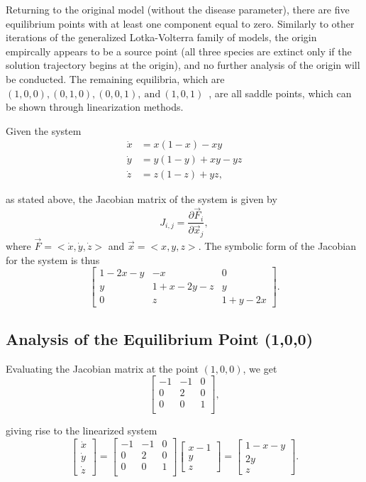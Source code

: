 \documentclass[10pt]{article}
\begin{document}
Returning to the original model (without the disease parameter), there are five equilibrium points with at least one component equal to zero. Similarly to other iterations of the generalized Lotka-Volterra family of models, the origin empircally appears to be a source point (all three species are extinct only if the solution trajectory begins at the origin), and no further analysis of the origin will be conducted. The remaining equilibria, which are \((1,0,0),(0,1,0),(0,0,1),\ \text{and} \ (1,0,1)\)~\cite{bdh}, are all saddle points, which can be shown through linearization methods.

Given the system 
\begin{align*}
\dot{x} &= x(1-x)-xy \\
\dot{y} &= y(1-y)+xy-yz \\
\dot{z} &= z(1-z)+yz,
\end{align*}

as stated above, the Jacobian matrix of the system is given by
\[J_{i,j} = \frac{\partial \vec{F}_i}{\partial \vec{x}_j},\]
where \(\vec{F} = <\dot{x},\dot{y},\dot{z}>\) and \(\vec{x} = <x,y,z>\). The symbolic form of the Jacobian for the system is thus
\[
\left[ 
\begin{array}{ccc}
1-2x-y & -x & 0 \\
y & 1+x-2y-z & y \\
0 & z & 1+y-2x 
\end{array}
\right].
\]

\subsection{Analysis of the Equilibrium Point (1,0,0)}

Evaluating the Jacobian matrix at the point \((1,0,0)\), we get 
\[
\left[ 
\begin{array}{ccc}
-1 & -1 & 0 \\
0 & 2 & 0 \\
0 & 0 & 1 \\
\end{array}
\right],
\]

giving rise to the linearized system
\[
\begin{bmatrix}
\dot{x} \\ \dot{y} \\ \dot{z}
\end{bmatrix} = 
\left[ 
\begin{array}{ccc}
-1 & -1 & 0 \\
0 & 2 & 0 \\
0 & 0 & 1 \\
\end{array}
\right]
\begin{bmatrix}
x - 1 \\ y  \\ z
\end{bmatrix} =
\begin{bmatrix}
1-x-y \\ 2y \\ z
\end{bmatrix}.
\]
\end{document}

